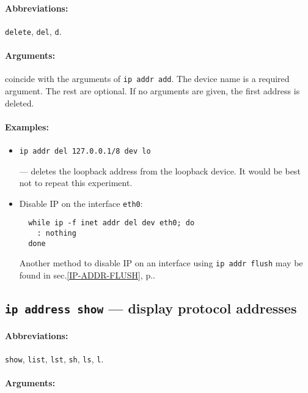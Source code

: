 \paragraph{Abbreviations:} \verb|delete|, \verb|del|, \verb|d|.

\paragraph{Arguments:} coincide with the arguments of \verb|ip addr add|.
The device name is a required argument. The rest are optional.
If no arguments are given, the first address is deleted.

\paragraph{Examples:}
\begin{itemize}
\item \verb|ip addr del 127.0.0.1/8 dev lo|

--- deletes the loopback address from the loopback device.
It would be best not to repeat this experiment.

\item Disable IP on the interface \verb|eth0|:
\begin{verbatim}
  while ip -f inet addr del dev eth0; do
    : nothing
  done
\end{verbatim}
Another method to disable IP on an interface using {\tt ip addr flush}
may be found in sec.\ref{IP-ADDR-FLUSH}, p.\pageref{IP-ADDR-FLUSH}.

\end{itemize}


\subsection{{\tt ip address show} --- display protocol addresses}

\paragraph{Abbreviations:} \verb|show|, \verb|list|, \verb|lst|, \verb|sh|, \verb|ls|,
\verb|l|.

\paragraph{Arguments:}

